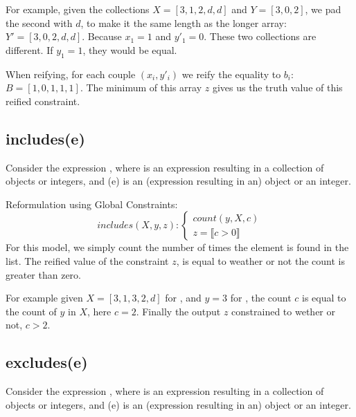 For example, given the collections $X=[3,1,2,d,d]$ and $Y=[3,0,2]$, we pad the second with $d$, to make it the same length as the longer array: $Y'=[3,0,2,d,d]$.
Because $x_1=1$ and $y'_1=0$. These two collections are different.
If $y_1=1$, they would be equal.

When reifying, for each couple $(x_i,y'_i)$ we reify the equality to $b_i$:
$B=[1,0,1,1,1]$. The minimum of this array $z$ gives us the truth value of this reified constraint.


\newpage\subsection{includes(e)}
Consider the expression , where  is an expression resulting in a collection of objects or integers, and \inelineocl(e) is an (expression resulting in an) object or an integer.

Reformulation using Global Constraints:
\begin{equation}\label{csp:includes}
    includes(X,y,z):
    \begin{cases}
        count(y,X,c)\\
        z = \llbracket c>0 \rrbracket
    \end{cases}
\end{equation}
For this model, we simply count the number of times the element is found in the list.
The reified value of the constraint $z$, is equal to weather or not the count is greater than zero.

For example given $X=[3,1,3,2,d]$ for , and $y=3$ for , the count $c$ is equal to the count of $y$ in $X$, here $c=2$.
Finally the output $z$ constrained to wether or not, $c>2$. 

\subsection{excludes(e)}
Consider the expression , where  is an expression resulting in a collection of objects or integers, and \inelineocl(e) is an (expression resulting in an) object or an integer.

